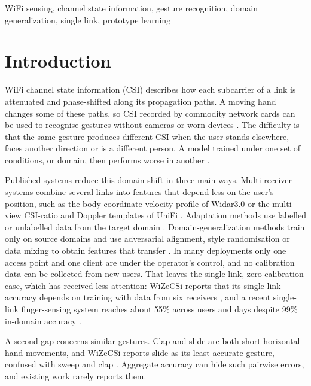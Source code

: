\documentclass[conference]{IEEEtran}
\begin{document}
\begin{IEEEkeywords}
WiFi sensing, channel state information, gesture recognition, domain generalization, single link, prototype learning
\end{IEEEkeywords}

\section{Introduction}
WiFi channel state information (CSI) describes how each subcarrier of a link is attenuated and phase-shifted along its propagation paths. A moving hand changes some of these paths, so CSI recorded by commodity network cards can be used to recognise gestures without cameras or worn devices \cite{halperin2011csitool,zhang2022widar3}. The difficulty is that the same gesture produces different CSI when the user stands elsewhere, faces another direction or is a different person. A model trained under one set of conditions, or domain, then performs worse in another \cite{zhang2022widar3,zhou2023dgsurvey}.

Published systems reduce this domain shift in three main ways. Multi-receiver systems combine several links into features that depend less on the user's position, such as the body-coordinate velocity profile of Widar3.0 \cite{zhang2022widar3} or the multi-view CSI-ratio and Doppler templates of UniFi \cite{liu2023unifi}. Adaptation methods use labelled or unlabelled data from the target domain \cite{feng2022wilearner,yan2025wisfdagr,jiao2025mswiar}. Domain-generalization methods train only on source domains and use adversarial alignment, style randomisation or data mixing to obtain features that transfer \cite{jiang2018ei,liu2023wisr,zhang2026gesfi}. In many deployments only one access point and one client are under the operator's control, and no calibration data can be collected from new users. That leaves the single-link, zero-calibration case, which has received less attention: WiZeCSi reports that its single-link accuracy depends on training with data from six receivers \cite{dai2026wizecsi}, and a recent single-link finger-sensing system reaches about 55\% across users and days despite 99\% in-domain accuracy \cite{koo2026dualaxis}.

A second gap concerns similar gestures. Clap and slide are both short horizontal hand movements, and WiZeCSi reports slide as its least accurate gesture, confused with sweep and clap \cite{dai2026wizecsi}. Aggregate accuracy can hide such pairwise errors, and existing work rarely reports them.
\end{document}
